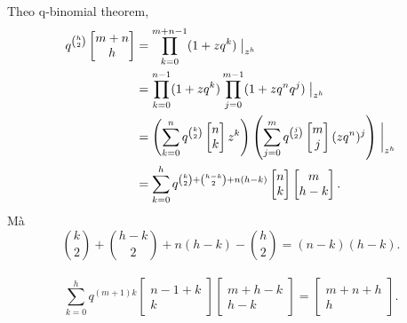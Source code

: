 \documentclass[11pt]{article}
\begin{document}
\paragraph{}
Theo q-binomial theorem,
\[
\begin{aligned}
  q^{\binom{h}{2}}
  \left[\begin{matrix}m+n\\ h\end{matrix}\right]
  &=
  \prod_{k=0}^{m+n-1}(1+zq^k)\bigm|_{z^h}  \\
  &=
  \prod_{k=0}^{n-1}(1+zq^k)
  \prod_{j=0}^{m-1}(1+zq^nq^j)\bigm|_{z^h}  \\
  &=
  \left(\sum_{k=0}^{n}q^{\binom{k}{2}}
  \left[\begin{matrix}n\\ k\end{matrix}\right]z^k\right)
  \left(\sum_{j=0}^{m}q^{\binom{j}{2}}
  \left[\begin{matrix}m\\ j\end{matrix}\right](zq^n)^j\right)
  \biggm|_{z^h} \\
  &=
  \sum_{k=0}^{h}
  q^{\binom{k}{2}+\binom{h-k}{2}+n(h-k)}
  \left[\begin{matrix}n\\ k\end{matrix}\right]
  \left[\begin{matrix}m\\ h-k\end{matrix}\right].
\end{aligned}
\]
Mà
\[
  \binom{k}{2}+\binom{h-k}{2}+n(h-k)-\binom{h}{2}
  =(n-k)(h-k).
\]


\paragraph{}
\[
  \sum_{k=0}^{h}
  q^{(m+1)k}
  \left[\begin{matrix}n-1+k\\ k\end{matrix}\right]
  \left[\begin{matrix}m+h-k\\ h-k\end{matrix}\right]
  =
  \left[\begin{matrix}m+n+h\\ h\end{matrix}\right].
\]
\end{document}
